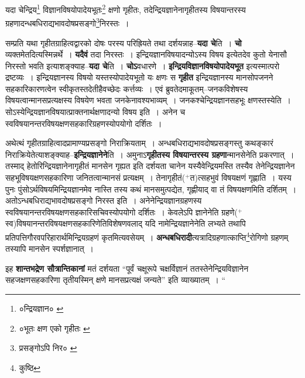 \documentclass[article,12pt,a4paper]{memoir}
\newcommand{\add}[1]{($^{+}$#1)}
\begin{document}
	  \pstart यदा चेन्द्रिय\footnote{०न्द्रियज्ञान० \cite{dp-msA} \cite{dp-msB} \cite{dp-msC} \cite{dp-edP} \cite{dp-edH} \cite{dp-edE} \cite{dp-edN}} विज्ञानविषयोपादेयभूतः\footnote{०भूतः क्षण एको गृहीतः \cite{dp-msD}} क्षणो गृहीतः, तदेन्द्रियज्ञानेनागृहीतस्य विषयान्तरस्य ग्रहणादन्धबधिराद्यभावदोषप्रसङ्गो\footnote{प्रसङ्गोऽपि निर० \cite{dp-msD}}\-निरस्तः ।
	\pend
      
	  \endgroup
	

	  \pstart सम्प्रति यथा गृहीतग्राहित्वद्वारको दोषः परस्य परिह्रियते तथा दर्शयन्नाह--\textbf{यदा चे}ति । \textbf{चो} व्यक्तमेतदित्यस्मिन्नर्थे । \textbf{यदैवं} तदा निरस्तः । इन्द्रियज्ञानविषयादन्योऽस्य विषय इत्येतदेव कुतो येनासौ निरस्तो भवति इत्याशङ्क्याह--\textbf{यदा चे}ति । \textbf{चोऽ}वधारणे । \textbf{इन्द्रियविज्ञानविषयोपादेयभूत} इत्यस्मात्परो द्रष्टव्यः । इन्द्रियज्ञानस्य विषयो यस्तस्योपादेयभूतो यः क्षणः स \textbf{गृहीत} इन्द्रियज्ञानस्य मानसोपजनने सहकारिकारणत्वेन स्वीकृतस्तदेतीहैवच्छेदः कर्त्तव्यः । एवं ब्रुवतेदमाकूतम्--जनकविशेषस्य विषयत्वान्मानसप्रत्यक्षस्य विषयेण भवता जनकेनावश्यभाव्यम् । जनकश्चेन्द्रियज्ञानसहभूः क्षणस्तस्येति । सोऽस्येन्द्रियज्ञानविषयात्प्राक्तनार्थक्षणादन्यो विषय इति । अनेन च स्वविषयानन्तरविषयक्षणसहकारिग्रहणस्योपयोगो दर्शितः ।
	\pend
      

	  \pstart अथेत्थं गृहीतग्राहित्वादप्रामाण्यप्रसङ्गो निराक्रियताम् । अन्धबधिराद्यभावदोषप्रसङ्गस्तु कथङ्कारं निराक्रियेतेत्याशङ्क्याह--\textbf{इन्द्रियज्ञानेने}ति । अमुनाऽ\textbf{गृहीतस्य विषयान्तरस्य ग्रहणा}न्मानसेनेति प्रकरणात् । तस्माद् हेतोरिन्द्रियज्ञानेनागृहीतं मानसेन गृह्यत इति दर्शयता चानेन यस्यैवेन्द्रियमस्ति तस्यैव तेनेन्द्रियज्ञानेन सहभूविषयक्षणसहकारिणा जनितत्वान्मानसं प्रत्यक्षम् । तेनागृहीतं\add{त}त्सहभुवं विषयक्षणं गृह्णाति । यस्य पुनः पुंसोऽर्थविषयमिन्द्रियज्ञानमेव नास्ति तस्य कथं मानसमुत्पद्येत, गृह्णीयाद् वा तं विषयक्षणमिति दर्शितम् । अतोऽन्धबधिराद्यभावदोषप्रसङ्गो निरस्त इति । अनेनेन्द्रियज्ञानग्रहणस्य स्वविषयानन्तरविषयक्षणसहकारिसचिवस्योपयोगो दर्शितः । केवलेऽपि ज्ञानेनेति ग्रहणे\add{स्व}\leavevmode{}विषयानन्तरविषयक्षणसहकारिणेतिविशेषणवलाद् यदि नामेन्द्रियज्ञानेनेति लभ्यते तथापि प्रतिपत्तिगौरवपरिहारार्थमिन्द्रियग्रहणं कृतमित्यवसेयम् । \textbf{अन्धबधिरादी}त्यत्रादिग्रहणात्काप्ति\footnote{कुष्ठि}\-रोगिणो ग्रहणम् तस्यापि मानसेन स्पर्शज्ञानात् ।
	\pend
      

	  \pstart इह \textbf{शान्तभद्रेण सौत्रान्तिकानां} मतं दर्शयता “पूर्वं चक्षूरूपे चक्षर्विज्ञानं ततस्तेनेन्द्रियविज्ञानेन सहजक्षणसहकारिणा तृतीयस्मिन् क्षणे मानसप्रत्यक्षं जन्यते” इति व्याख्यातम् ।  \leavevmode{} “
	  
\end{document}
